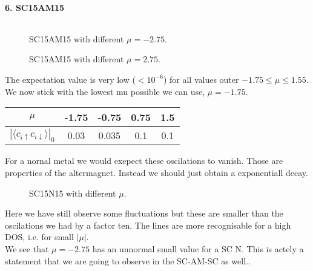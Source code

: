 \documentclass[../main.tex]{subfiles}
\begin{document}
\paragraph{6. SC15AM15}$~$\\
\begin{figure}[H]
    \centering
    
    \caption{SC15AM15 with different $\mu = -2.75$.}
\end{figure}
\begin{figure}[H]
    \centering
    
    \caption{SC15AM15 with different $\mu = 2.75$.}
\end{figure}
The expectation value is very low ($<10^{-6}$) for all values outer $-1.75\le\mu\le1.55$.
We now stick with the lowest mu possible we can use, $\mu = -1.75$.
\begin{table}[H]
    \centering
    \begin{tabular}{c|c|c|c|c}
        $\mu$          & -1.75 & -0.75 & 0.75 & 1.5 \\\hline\hline
         $|\langle c_{i\uparrow}c_{i\downarrow}\rangle|_0$  & 0.03  & 0.035 &  0.1  & 0.1
    \end{tabular}
\end{table}

%     

For a nornal metal we would exepect these oscilations to vanish. Those are properties of the altermagnet. Instead we should just obtain a exponentiall decay.
\begin{figure}[H]
    \centering
    
    \caption{SC15N15 with different $\mu$.}
    \label{fig:SC15N15}
\end{figure}
Here we have still observe some fluctuations but these are smaller than the oscilations we had by a factor ten. The lines are more recognisable for a high DOS, i.e. for small $|\mu|$.\\
We see that $\mu = -2.75$ has an unnormal small value for a SC N. This is actely a statement that we are going to observe  in the SC-AM-SC as well..
\end{document}
